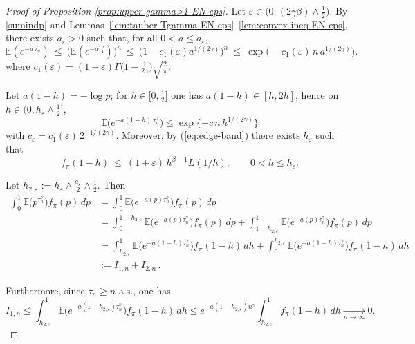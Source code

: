 \documentclass[preprint]{imsart}
\newcommand{\EE}{\mathbb{E}}
\newcommand{\1}{\mathbf{1}}
\theoremstyle{plain}
\theoremstyle{definition}
\begin{document}
\begin{proof}[Proof of Proposition \ref{prop:upper-gamma>1-EN-eps}]
    Let \(\varepsilon\in \bigl(0,(2\gamma\beta)\wedge\tfrac{1}{2}\bigr)\). By \eqref{sumindp} and Lemmas~\ref{lem:tauber-Tgamma-EN-eps}–\ref{lem:convex-ineq-EN-eps},
there exists $a_\varepsilon>0$ such that, for all $0<a\le a_\varepsilon$,
\[
\EE(e^{-a\,\tau_n^\gamma})\ \le\ \big(\EE(e^{-a \tau_1^\gamma})\big)^n\ \le\ \big(1-c_1(\varepsilon) a^{1/(2\gamma)}\big)^n
\ \le\ \exp\big(-c_1(\varepsilon)\,n\,a^{1/(2\gamma)}\big).
\]
where \(c_1(\varepsilon)=(1-\varepsilon)\Gamma\!\bigl(1-\tfrac{1}{2\gamma}\bigr)\sqrt{\tfrac{2}{\pi}}\). 

Let \(a(1-h)=-\log p\); for \(h\in \bigl[0,\tfrac{1}{2}\bigr]\) one has \(a(1-h)\in [h,2h]\), hence on \(h\in\bigl(0,h_\varepsilon\wedge\tfrac{1}{2}\bigr]\),
\begin{equation}\label{gac1}
\EE\!\big(e^{-a(1-h)\,\tau_n^\gamma}\big)\le \exp\{-c\,n\, h^{1/(2\gamma)}\} 
\end{equation}
with \(c_{\varepsilon}=c_1(\varepsilon)\,2^{-1/(2\gamma)}\). Moreover, by (\ref{eq:edge-band}) there exists \(h_{\varepsilon}\) such that 
\begin{equation}\label{gac2}
f_\pi(1-h)\ \le\
(1+\varepsilon)\,h^{\beta-1}L(1/h),\qquad 0<h\le h_\varepsilon .
\end{equation}

Let \(h_{2,\varepsilon}:=h_{\varepsilon}\wedge\tfrac{a_{\varepsilon}}{2}\wedge\tfrac{1}{2}\). Then
\begin{equation}
    \begin{split}
        \int_{0}^{1}\EE\!\big(p^{\tau_n^{\gamma}}\big)f_{\pi}(p)\,dp
        &=\int_{0}^{1}\EE\!\big(e^{-a(p)\tau_n^{\gamma}}\big)f_{\pi}(p)\,dp\\
        &=\int_{0}^{1-h_{2,\varepsilon}}\EE\!\big(e^{-a(p)\tau_n^{\gamma}}\big)f_{\pi}(p)\,dp+\int_{1-h_{2,\varepsilon}}^{1}\EE\!\big(e^{-a(p)\tau_n^{\gamma}}\big)f_{\pi}(p)\,dp\\
        &=\int_{h_{2,\varepsilon}}^{1}\EE\!\big(e^{-a(1-h)\tau_n^{\gamma}}\big)f_{\pi}(1-h)\,dh+\int_{0}^{h_{2,\varepsilon}}\EE\!\big(e^{-a(1-h)\tau_n^{\gamma}}\big)f_{\pi}(1-h)\,dh\\
        &:=I_{1,n}+I_{2,n}\,.
    \end{split}
\end{equation}

Furthermore, since \(\tau_{n}\ge n\) a.s., one has
\begin{equation}\label{limI_1}
        I_{1,n}\le \int_{h_{2,\varepsilon}}^{1}\EE\!\big(e^{-a(1-h_{2,\varepsilon})\tau_n^{\gamma}}\big)f_{\pi}(1-h)\,dh
        \le e^{-a(1-h_{2,\varepsilon})n^{\gamma}}\int_{h_{2,\varepsilon}}^{1}f_{\pi}(1-h)\,dh
        \xrightarrow[n\to\infty]{}0.
\end{equation}


\end{proof}
\end{document}
